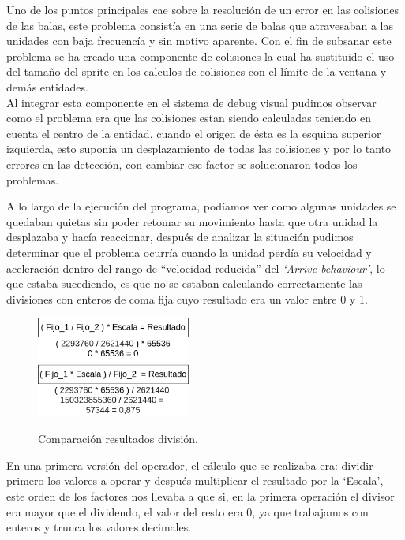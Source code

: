 Uno de los puntos principales cae sobre la resolución de un error en las colisiones de las balas,
este problema consistía en una serie de balas que atravesaban a las unidades con baja frecuencía
y sin motivo aparente. Con el fin de subsanar este problema se ha creado una componente de colisiones
la cual ha sustituido el uso del tamaño del sprite en los calculos de colisiones con el límite de la 
ventana y demás entidades. \\
Al integrar esta componente en el sistema de debug visual pudimos observar como el problema era que las
colisiones estan siendo calculadas teniendo en cuenta el centro de la entidad, cuando el origen de ésta
es la esquina superior izquierda, esto suponía un desplazamiento de todas las colisiones y por lo tanto
errores en las detección, con cambiar ese factor se solucionaron todos los problemas.

A lo largo de la ejecución del programa, podíamos ver como algunas unidades se quedaban quietas sin poder
retomar su movimiento hasta que otra unidad la desplazaba y hacía reaccionar, después de analizar la situación
pudimos determinar que el problema ocurría cuando la unidad perdía su velocidad y aceleración dentro del
rango de ``velocidad reducida'' del \textit{`Arrive behaviour'}, lo que estaba sucediendo, es que no se
estaban calculando correctamente las divisiones con enteros de coma fija cuyo resultado era un valor
entre 0 y 1.

\begin{figure}[ht]
\centering
\includegraphics[width=0.45\textwidth]{imagenes/diario_desarrollo/division_entera.png}\\
\caption{Comparación resultados división.}
\label{fig:div_int}
\end{figure}

En una primera versión del operador, el cálculo que se realizaba era: dividir primero los valores a operar
y después multiplicar el resultado por la `Escala', este orden de los factores nos llevaba a que si, en la
primera operación el divisor era mayor que el dividendo, el valor del resto era 0, ya que trabajamos
con enteros y trunca los valores decimales.

